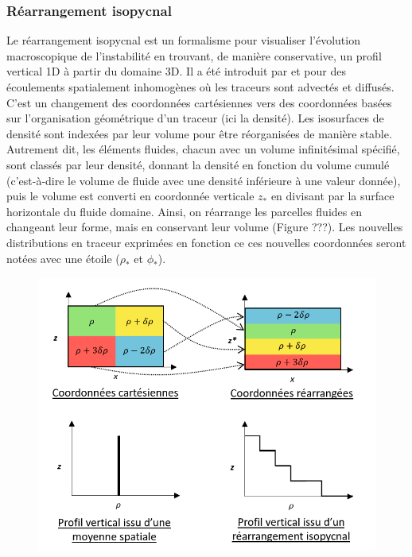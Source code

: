 \documentclass[a4paper,12pt]{article}
\begin{document}
    
        \subsubsection{Réarrangement isopycnal}
        
        Le réarrangement isopycnal est un formalisme pour visualiser l'évolution macroscopique de l'instabilité en trouvant, de manière conservative, un profil vertical 1D à partir du domaine 3D. Il a été introduit par \citep{nakamura_two-dimensional_1996} et \citep*{winters_diascalar_1996} pour des écoulements spatialement inhomogènes où les traceurs sont advectés et diffusés. C'est un changement des coordonnées cartésiennes vers des coordonnées basées sur l'organisation géométrique d'un traceur (ici la densité). Les isosurfaces de densité sont indexées par leur volume pour être réorganisées de manière stable. Autrement dit, les éléments fluides, chacun avec un volume infinitésimal spécifié, sont classés par leur densité, donnant la densité en fonction du volume cumulé (c'est-à-dire le volume de fluide avec une densité inférieure à une valeur donnée), puis le volume est converti en coordonnée verticale $z_*$ en divisant par la surface horizontale du fluide domaine. Ainsi, on réarrange les parcelles fluides en changeant leur forme, mais en conservant leur volume (Figure ???). Les nouvelles distributions en traceur exprimées en fonction ce ces nouvelles coordonnées seront notées avec une étoile ($\rho_*$ et $\phi_*$).
        \begin{figure}[!h]
	    \centering		
		    \includegraphics[width=0.9\linewidth]{figures/rearrangementisop.png}
            \caption{}
	        \label{rea_isop}
        \end{figure}
\end{document}
